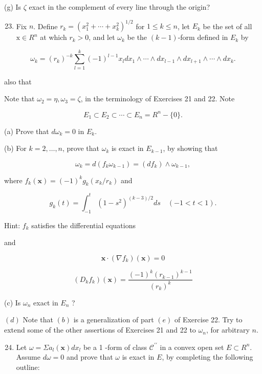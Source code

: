 \documentclass[10pt]{article}
\begin{document}
(g) Is $\zeta$ exact in the complement of every line through the origin?

\begin{enumerate}
  \setcounter{enumi}{22}
  \item Fix $n$. Define $r_{k}=\left(x_{1}^{2}+\cdots+x_{k}^{2}\right)^{1 / 2}$ for $1 \leq k \leq n$, let $E_{k}$ be the set of all $\mathrm{x} \in R^{n}$ at which $r_{k}>0$, and let $\omega_{k}$ be the $(k-1)$-form defined in $E_{k}$ by
\end{enumerate}

$$
\omega_{k}=\left(r_{k}\right)^{-k} \sum_{l=1}^{k}(-1)^{l-1} x_{l} d x_{1} \wedge \cdots \wedge d x_{l-1} \wedge d x_{l+1} \wedge \cdots \wedge d x_{k} .
$$

also that

Note that $\omega_{2}=\eta, \omega_{3}=\zeta$, in the terminology of Exercises 21 and 22. Note

$$
E_{1} \subset E_{2} \subset \cdots \subset E_{n}=R^{n}-\{0\} .
$$

(a) Prove that $d \omega_{k}=0$ in $E_{k}$.

(b) For $k=2, \ldots, n$, prove that $\omega_{k}$ is exact in $E_{k-1}$, by showing that

$$
\omega_{k}=d\left(f_{k} \omega_{k-1}\right)=\left(d f_{k}\right) \wedge \omega_{k-1},
$$

where $f_{k}(\mathbf{x})=(-1)^{k} g_{k}\left(x_{k} / r_{k}\right)$ and

$$
g_{k}(t)=\int_{-1}^{t}\left(1-s^{2}\right)^{(k-3) / 2} d s \quad(-1<t<1) .
$$

Hint: $f_{k}$ satisfies the differential equations

and

$$
\mathbf{x} \cdot\left(\nabla f_{k}\right)(\mathbf{x})=0
$$

$$
\left(D_{k} f_{k}\right)(\mathbf{x})=\frac{(-1)^{k}\left(r_{k-1}\right)^{k-1}}{\left(r_{k}\right)^{k}}
$$

(c) Is $\omega_{n}$ exact in $E_{n}$ ?

$(d)$ Note that $(b)$ is a generalization of part $(e)$ of Exercise 22. Try to extend some of the other assertions of Exercises 21 and 22 to $\omega_{n}$, for arbitrary $n$.

\begin{enumerate}
  \setcounter{enumi}{23}
  \item Let $\omega=\Sigma a_{l}(\mathbf{x}) d x_{l}$ be a 1 -form of class $\mathscr{C}^{\prime \prime}$ in a convex open set $E \subset R^{n}$. Assume $d \omega=0$ and prove that $\omega$ is exact in $E$, by completing the following outline:
\end{enumerate}
\end{document}
